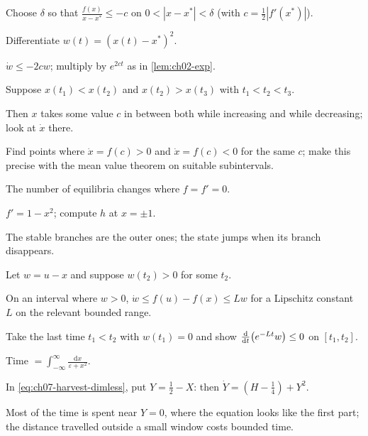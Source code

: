 \begin{hintlevels}
  \item Choose $\delta$ so that $\frac{f(x)}{x - x^*}\le -c$ on
        $0<|x - x^*|<\delta$ (with $c = \frac12|f'(x^*)|$).
  \item Differentiate $w(t) = (x(t) - x^*)^2$.
  \item $\dot w\le -2cw$; multiply by $e^{2ct}$ as in \cref{lem:ch02-exp}.
\end{hintlevels}

\begin{hintlevels}
  \item Suppose $x(t_1)<x(t_2)$ and $x(t_2)>x(t_3)$ with $t_1<t_2<t_3$.
  \item Then $x$ takes some value $c$ in between both while increasing and while
        decreasing; look at $\dot x$ there.
  \item Find points where $\dot x = f(c)>0$ and $\dot x = f(c)<0$ for the same
        $c$; make this precise with the mean value theorem on suitable
        subintervals.
\end{hintlevels}

\begin{hintlevels}
  \item The number of equilibria changes where $f = f' = 0$.
  \item $f' = 1 - x^2$; compute $h$ at $x = \pm1$.
  \item The stable branches are the outer ones; the state jumps when its branch
        disappears.
\end{hintlevels}

\begin{hintlevels}
  \item Let $w = u - x$ and suppose $w(t_2)>0$ for some $t_2$.
  \item On an interval where $w>0$, $\dot w\le f(u) - f(x)\le Lw$ for a
        Lipschitz constant $L$ on the relevant bounded range.
  \item Take the last time $t_1<t_2$ with $w(t_1) = 0$ and show
        $\frac{\mathrm{d}}{\mathrm{d}t}\bigl(e^{-Lt}w\bigr)\le0$ on $[t_1,t_2]$.
\end{hintlevels}

\begin{hintlevels}
  \item {} Time $= \int_{-\infty}^{\infty}\frac{\mathrm{d}x}{\varepsilon + x^2}$.
  \item In \eqref{eq:ch07-harvest-dimless}, put $Y = \tfrac12 - X$: then
        $\dot Y = (H - \tfrac14) + Y^2$.
  \item Most of the time is spent near $Y = 0$, where the equation looks like
        the first part; the distance travelled outside a small window costs
        bounded time.
\end{hintlevels}

